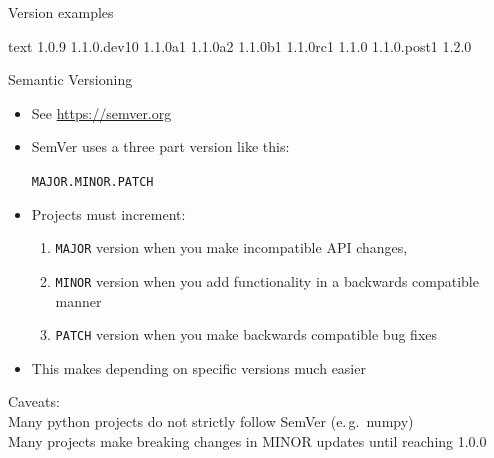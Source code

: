 \documentclass[
  aspectratio=1610,
]{beamer}
\begin{document}
\begin{frame}[fragile, c]{Version examples}
  \begin{code}[title=Versions in sorted order]{text}
    1.0.9
    1.1.0.dev10
    1.1.0a1
    1.1.0a2
    1.1.0b1
    1.1.0rc1
    1.1.0
    1.1.0.post1
    1.2.0
  \end{code}
\end{frame}

\begin{frame}[c]{Semantic Versioning}
  \begin{itemize}
    \item See \url{https://semver.org}

    \item SemVer uses a three part version like this:
      \begin{center}
        \Large\texttt{MAJOR.MINOR.PATCH}
      \end{center}
    \item Projects must increment:
      \begin{enumerate}
        \item \texttt{MAJOR} version when you make incompatible API changes,
        \item \texttt{MINOR} version when you add functionality in a backwards compatible manner
        \item \texttt{PATCH} version when you make backwards compatible bug fixes
      \end{enumerate}
    \item This makes depending on specific versions much easier
  \end{itemize}

  \bigskip
  \begin{center}
    Caveats:\\
    Many python projects do not strictly follow SemVer (e.\,g.\ numpy) \\
    Many projects make breaking changes in MINOR updates until reaching 1.0.0
  \end{center}
\end{frame}
\end{document}
